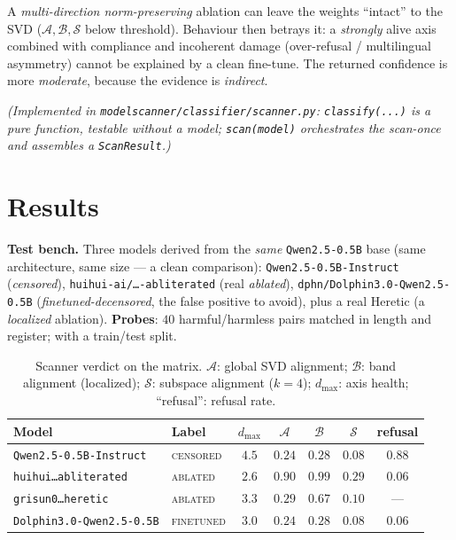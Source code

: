 \documentclass[11pt,a4paper]{article}
\theoremstyle{definition}
\theoremstyle{plain}
\begin{document}
\begin{intuition}
A \emph{multi-direction norm-preserving} ablation can leave the weights ``intact'' to
the SVD ($\mathcal{A},\mathcal{B},\mathcal{S}$ below threshold). Behaviour then betrays
it: a \emph{strongly} alive axis combined with compliance and incoherent damage
(over-refusal / multilingual asymmetry) cannot be explained by a clean fine-tune. The
returned confidence is more \emph{moderate}, because the evidence is \emph{indirect}.
\end{intuition}

\noindent\emph{(Implemented in \texttt{modelscanner/classifier/scanner.py}:
\texttt{classify(...)} is a pure function, testable without a model; \texttt{scan(model)}
orchestrates the scan-once and assembles a \texttt{ScanResult}.)}

\section{Results}\label{sec:resultats}
\textbf{Test bench.} Three models derived from the \emph{same} \texttt{Qwen2.5-0.5B}
base (same architecture, same size — a clean comparison):
\texttt{Qwen2.5-0.5B-Instruct} (\emph{censored}),
\texttt{huihui-ai/\dots-abliterated} (real \emph{ablated}),
\texttt{dphn/Dolphin3.0-Qwen2.5-0.5B} (\emph{finetuned-decensored}, the false
positive to avoid), plus a real Heretic (a \emph{localized} ablation).
\textbf{Probes}: $40$ harmful/harmless pairs matched in length and register; with a
train/test split.

\begin{table}[H]
\centering
\caption{Scanner verdict on the matrix. $\mathcal{A}$: global SVD alignment;
$\mathcal{B}$: band alignment (localized); $\mathcal{S}$: subspace alignment
($k{=}4$); $d_{\max}$: axis health; ``refusal'': refusal rate.}
\label{tab:matrice}
\begin{tabular}{llccccc}
\toprule
Model & Label & $d_{\max}$ & $\mathcal{A}$ & $\mathcal{B}$ & $\mathcal{S}$ & refusal \\
\midrule
\texttt{Qwen2.5-0.5B-Instruct} & \textsc{censored} & $4.5$ & $0.24$ & $0.28$ & $0.08$ & $0.88$ \\
\texttt{huihui\dots abliterated} & \textsc{ablated} & $2.6$ & $\mathbf{0.90}$ & $\mathbf{0.99}$ & $0.29$ & $0.06$ \\
\texttt{grisun0\dots heretic} & \textsc{ablated} & $3.3$ & $0.29$ & $\mathbf{0.67}$ & $0.10$ & --- \\
\texttt{Dolphin3.0-Qwen2.5-0.5B} & \textsc{finetuned} & $3.0$ & $0.24$ & $0.28$ & $0.08$ & $0.06$ \\
\bottomrule
\end{tabular}
\end{table}
\end{document}
